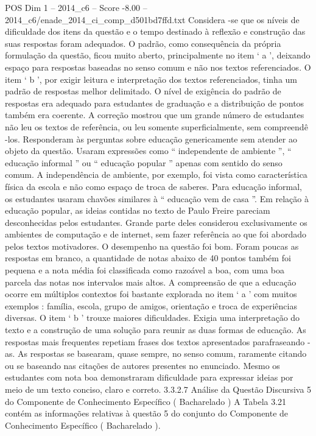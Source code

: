 \begin{textsample}{POS Dim 1 – 2014\_c6 – Score -8.00 – 2014\_c6/enade\_2014\_ci\_comp\_d501bd7ffd.txt}
Considera -se que os níveis de dificuldade dos itens da questão e o tempo destinado à reflexão e construção das suas respostas foram adequados.
O padrão, como consequência da própria formulação da questão, ficou muito aberto, principalmente no item ‘ a ’, deixando espaço para respostas baseadas no senso comum e não nos textos referenciados.
O item ‘ b ’, por exigir leitura e interpretação dos textos referenciados, tinha um padrão de respostas melhor delimitado.
O nível de exigência do padrão de respostas era adequado para estudantes de graduação e a distribuição de pontos também era coerente.
A correção mostrou que um grande número de estudantes não leu os textos de referência, ou leu somente superficialmente, sem compreendê -los.
Responderam às perguntas sobre educação genericamente sem atender ao objeto da questão.
Usaram expressões como “ independente de ambiente ”, “ educação informal ” ou “ educação popular ” apenas com sentido do senso comum.
A independência de ambiente, por exemplo, foi vista como característica física da escola e não como espaço de troca de saberes.
Para educação informal, os estudantes usaram chavões similares à “ educação vem de casa ”.
Em relação à educação popular, as ideias contidas no texto de Paulo Freire pareciam desconhecidas pelos estudantes.
Grande parte deles considerou exclusivamente os ambientes de computação e de internet, sem fazer referência ao que foi abordado pelos textos motivadores.
O desempenho na questão foi bom.
Foram poucas as respostas em branco, a quantidade de notas abaixo de 40 pontos também foi pequena e a nota média foi classificada como razoável a boa, com uma boa parcela das notas nos intervalos mais altos.
A compreensão de que a educação ocorre em múltiplos contextos foi bastante explorada no item ‘ a ’ com muitos exemplos : família, escola, grupo de amigos, orientação e troca de experiências diversas.
O item ‘ b ’ trouxe maiores dificuldades.
Exigia uma interpretação do texto e a construção de uma solução para reunir as duas formas de educação.
As respostas mais frequentes repetiam frases dos textos apresentados parafraseando -as.
As respostas se basearam, quase sempre, no senso comum, raramente citando ou se baseando nas citações de autores presentes no enunciado.
Mesmo os estudantes com nota boa demonstraram dificuldade para expressar ideias por meio de um texto conciso, claro e correto. 3.3.2.7 Análise da Questão Discursiva 5 do Componente de Conhecimento Específico ( Bacharelado ) A Tabela 3.21 contém as informações relativas à questão 5 do conjunto do Componente de Conhecimento Específico ( Bacharelado ).

\end{textsample}
